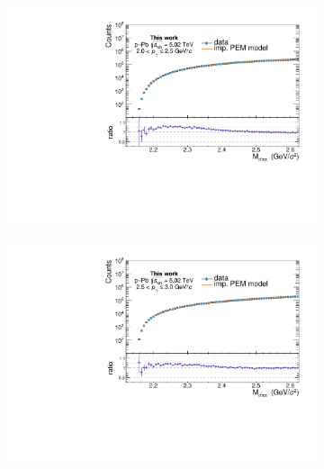 \begin{appendices}
\begin{figure}[htb]
\begin{subfigure}{.5\textwidth}
  \centering
  \captionsetup{justification=centering}
  \includegraphics[width=\linewidth]{gfx/appendix/backsub/can_unblind4}
  \caption{}
\end{subfigure}%
\begin{subfigure}{.5\textwidth}
  \centering
  \captionsetup{justification=centering}
  \includegraphics[width=\linewidth]{gfx/appendix/backsub/can_unblind5}
  \caption{}
\end{subfigure}
\begin{subfigure}{.5\textwidth}
  \centering
  \captionsetup{justification=centering}

\end{subfigure}
\end{figure}
\end{appendices}
